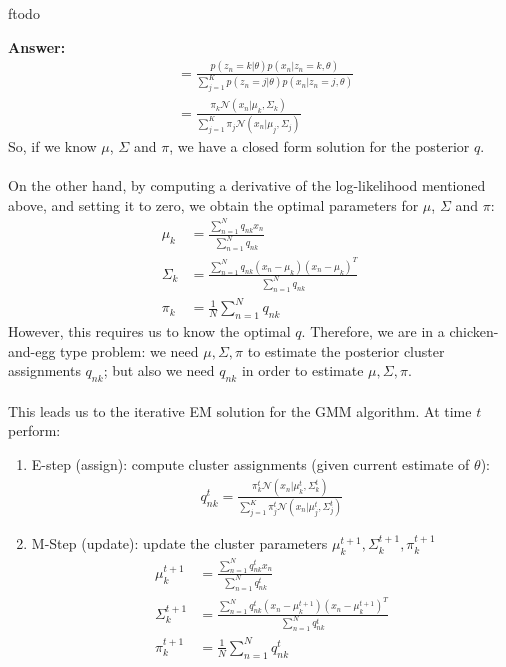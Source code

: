 ƒtodo\documentclass{article}
\newenvironment{QandA}{\begin{enumerate}[label=\arabic*.]}{\end{enumerate}}
\newenvironment{InnerQandA}{\begin{enumerate}[label=\roman*.]}{\end{enumerate}}
\newenvironment{answer}{\par\normalfont \textbf{Answer:}}{}
\newcommand{\g}{\vert}
\begin{document}
\begin{QandA}
\begin{InnerQandA}
\begin{answer}
\begin{align*}
                &= \frac{p(z_n=k \g \theta)p(x_n \g z_n = k, \theta)}{\sum_{j=1}^K p(z_n=j \g \theta)p(x_n \g z_n = j, \theta)} \\
                &= \frac{\pi_k \mathcal{N}(x_n \g \mu_k, \Sigma_k)}{\sum_{j=1}^K \pi_j \mathcal{N}(x_n \g \mu_j, \Sigma_j)}
            \end{align*}
            So, if we know $\mu$, $\Sigma$ and $\pi$, we have a closed form solution for the posterior $q$. \\\\
            On the other hand, by computing a derivative of the log-likelihood mentioned above, and setting it to zero, we obtain the optimal parameters for $\mu$, $\Sigma$ and $\pi$:
            \begin{align*}
                \mu_k &= \frac{\sum_{n=1}^N q_{nk} x_n}{\sum_{n=1}^N q_{nk}}\\
                \Sigma_k &= \frac{\sum_{n=1}^N q_{nk}(x_n - \mu_k)(x_n - \mu_k)^T}{\sum_{n=1}^N q_{nk}} \\
                \pi_k &= \frac{1}{N}\sum_{n=1}^N q_{nk}
            \end{align*}
            However, this requires us to know the optimal $q$. Therefore, we are in a chicken-and-egg type problem: we need $\mu, \Sigma, \pi$ to estimate the posterior cluster assignments $q_{nk}$; but also we need $q_{nk}$ in order to estimate $\mu, \Sigma, \pi$. \\\\
            This leads us to the iterative EM solution for the GMM algorithm. At time $t$ perform:
            \begin{enumerate}[label=\arabic*.]
                \item E-step (assign): compute cluster assignments (given current estimate of $\theta$):
                \begin{align*}
                    q_{nk}^t = \frac{\pi_k^t \mathcal{N}(x_n \g \mu_k^t, \Sigma_k^t)}{\sum_{j=1}^K \pi_j^t \mathcal{N}(x_n \g \mu_j^t, \Sigma_j^t)}
                \end{align*}
                \item M-Step (update): update the cluster parameters $\mu_k^{t+1}, \Sigma_{k}^{t+1}, \pi_k^{t+1}$
                \begin{align*}
                \mu_k^{t+1} &= \frac{\sum_{n=1}^N q_{nk}^t x_n}{\sum_{n=1}^N q_{nk}^t}\\
                \Sigma_k^{t+1} &= \frac{\sum_{n=1}^N q_{nk}^t(x_n - \mu_k^{t+1})(x_n - \mu_k^{t+1})^T}{\sum_{n=1}^N q_{nk}^t} \\
                \pi_k^{t+1} &= \frac{1}{N}\sum_{n=1}^N q_{nk}^t
            \end{align*}
            \end{enumerate}


\end{answer}
\end{InnerQandA}
\end{QandA}
\end{document}
